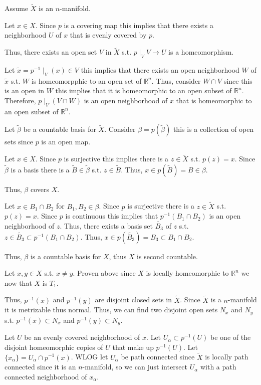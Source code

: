 \documentclass[12pt, letterpaper]{article}
\newcommand{\R}{\mathbb{R}}
\begin{document}
\begin{problemproof}
  Assume $\widetilde{X}$ is an $n$-manifold.

  Let $x \in X$. Since $p$ is a covering map this implies that there exists a neighborhood $U$ of $x$ that is evenly covered by $p$.

  Thus, there exists an open set $V$ in $\widetilde{X}$ s.t. $p\mid_{V} V \to U$ is a homeomorphism.

  Let $\widetilde{x}=p^{-1}\mid_V(x) \in V$ this implies that there exists an open neighborhood $W$ of $\widetilde{x}$ s.t. $W$ is homeomorpphic to an open set of $\R^n$. Thus, consider $W \cap V$ since this is an open in $W$ this implies that it is homeomorphic to an open subset of $\R^n$.
  Therefore, $p\mid_V(V \cap W)$ is an open neighborhood of $x$ that is homeomorphic to an open subset of $\R^n$.

  Let $\widetilde{\beta}$ be a countable basis for $\widetilde{X}$. Consider $\beta=p(\widetilde{\beta})$ this is a collection of open sets since $p$ is an open map.

  Let $x \in X$. Since $p$ is surjective this implies there is a $z \in \widetilde{X}$ s.t. $p(z)=x$. Since $\widetilde{\beta}$ is a basis there is a $\widetilde{B} \in \widetilde{\beta}$ s.t. $z \in \widetilde{B}$. Thus, $x \in p(\widetilde{B})=B \in \beta$.
  
  Thus, $\beta$ covers $X$.

  Let $x \in B_1 \cap B_2$ for $B_1,B_2 \in \beta$. Since $p$ is surjective there is a $z \in \widetilde{X}$ s.t. $p(z)=x$. Since $p$ is continuous this implies that $p^{-1}(B_1 \cap B_2)$ is an open neighborhood of $z$.
  Thus, there exists a basis set $\widetilde{B_3}$ of $z$ s.t. $z \in \widetilde{B_3} \subset p^{-1}(B_1 \cap B_2)$. Thus, $x \in p(\widetilde{B_3})=B_3 \subset B_1 \cap B_2$.

  Thus, $\beta$ is a countable basis for $X$, thus $X$ is second countable.
  
  Let $x,y \in X$ s.t. $x \neq y$. Proven above since $X$ is locally homeomorphic to $\R^n$ we now that $X$ is $T_1$.

  Thus, $p^{-1}(x)$ and $p^{-1}(y)$ are disjoint closed sets in $\widetilde{X}$. Since $\widetilde{X}$ is a $n$-manifold it is metrizable thus normal. Thus, we can find two disjoint open sets $N_x$ and $N_y$ s.t. $p^{-1}(x) \subset N_x$ and $p^{-1}(y) \subset N_y$.

  Let $U$ be an evenly covered neighborhood of $x$. Let $U_\alpha \subset p^{-1}(U)$ be one of the disjoint homeomorphic copies of $U$ that make up $p^{-1}(U)$. Let $\{x_\alpha\} = U_\alpha \cap p^{-1}(x)$. WLOG let $U_\alpha$ be path connected since $\widetilde{X}$ is locally path connected since it is an $n$-manifold, so we can just intersect $U_\alpha$ with a path connected neighborhood of $x_\alpha$.


\end{problemproof}
\end{document}
